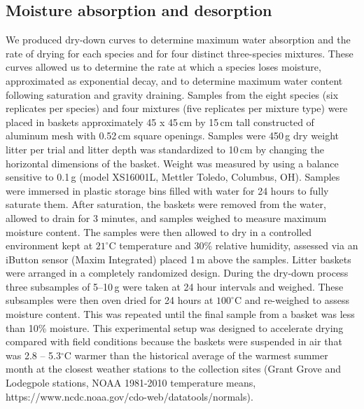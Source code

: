 \documentclass[letterpaper,12pt]{article}
\begin{document}
\subsection*{Moisture absorption and desorption}

We produced dry-down curves to determine maximum water absorption and the rate
of drying for each species and for four distinct three-species mixtures. These
curves allowed us to determine the rate at which a species loses moisture,
approximated as exponential decay, and to determine maximum water content
following saturation and gravity draining. Samples from the eight species (six
replicates per species) and four mixtures (five replicates per mixture type)
were placed in baskets approximately 45 x 45\,cm by 15\,cm tall constructed of
aluminum mesh with 0.52\,cm square openings. Samples were 450\,g dry weight
litter per trial and litter depth was standardized to 10\,cm by changing the
horizontal dimensions of the basket. Weight was measured by using a balance
sensitive to 0.1\,g (model XS16001L, Mettler Toledo, Columbus, OH). Samples
were immersed in plastic storage bins filled with water for 24 hours to fully
saturate them. After saturation, the baskets were removed from the water,
allowed to drain for 3 minutes, and samples weighed to measure maximum moisture
content. The samples were then allowed to dry in a controlled environment kept
at $21^\circ$C temperature and 30\% relative humidity, assessed via an iButton
sensor (Maxim Integrated) placed 1\,m above the samples. Litter baskets were
arranged in a completely randomized design. During the dry-down process three
subsamples of 5--10\,g were taken at 24 hour intervals and weighed. These
subsamples were then oven dried for 24 hours at $100^\circ$C and re-weighed to
assess moisture content. This was repeated until the final sample from a basket
was less than 10\% moisture. This experimental setup was designed to accelerate
drying compared with field conditions because the baskets were suspended in air
that was 2.8 -- 5.3$^\circ$C warmer than the historical average of the warmest
summer month at the closest weather stations to the collection sites (Grant
Grove and Lodegpole stations, NOAA 1981-2010 temperature means,
https://www.ncdc.noaa.gov/cdo-web/datatools/normals).
\end{document}
